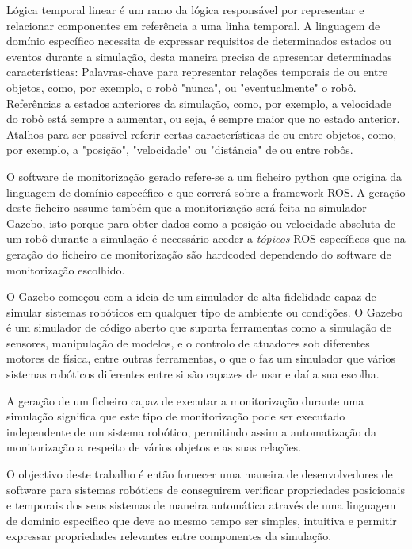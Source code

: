 Lógica temporal linear é um ramo da lógica responsável por representar e relacionar componentes em referência a uma linha temporal. A linguagem de domínio específico necessita de expressar requisitos de determinados estados ou eventos durante a simulação, desta maneira precisa de apresentar determinadas características: Palavras-chave para representar relações temporais de ou entre objetos, como, por exemplo, o robô "nunca", ou "eventualmente" o robô. Referências a estados anteriores da simulação, como, por exemplo, a velocidade do robô está sempre a aumentar, ou seja, é sempre maior que no estado anterior. Atalhos para ser possível referir certas características de ou entre objetos, como, por exemplo, a "posição", "velocidade" ou "distância" de ou entre robôs.

O software de monitorização gerado refere-se a um ficheiro python que origina da linguagem de domínio especéfico e que correrá sobre a framework ROS. A geração deste ficheiro assume também que a monitorização será feita no simulador Gazebo, isto porque para obter dados como a posição ou velocidade absoluta de um robô durante a simulação é necessário aceder a \textit{tópicos} ROS específicos que na geração do ficheiro de monitorização são hardcoded dependendo do software de monitorização escolhido. 

O Gazebo começou com a ideia de um simulador de alta fidelidade capaz de simular sistemas robóticos em qualquer tipo de ambiente ou condições. O Gazebo é um simulador de código aberto que suporta ferramentas como a simulação de sensores, manipulação de modelos, e o controlo de atuadores sob diferentes motores de física, entre outras ferramentas, o que o faz um simulador que vários sistemas robóticos diferentes entre si são capazes de usar e daí a sua escolha.

A geração de um ficheiro capaz de executar a monitorização durante uma simulação significa que este tipo de monitorização pode ser executado independente de um sistema robótico, permitindo assim a automatização da monitorização a respeito de vários objetos e as suas relações.

O objectivo deste trabalho é então fornecer uma maneira de desenvolvedores de software para sistemas robóticos de conseguirem verificar propriedades posicionais e temporais dos seus sistemas de maneira automática através de uma linguagem de dominio especifico que deve ao mesmo tempo ser simples, intuitiva e permitir expressar propriedades relevantes entre componentes da simulação.

